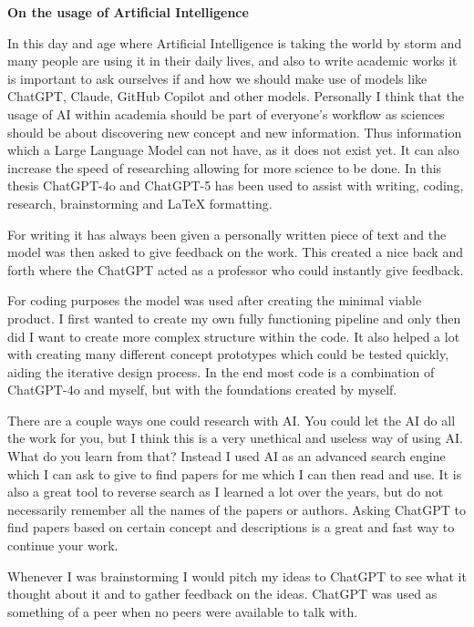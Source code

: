 \newpage
\vspace*{2.2 cm}
{\Large
\noindent
{\bf On the usage of Artificial Intelligence}} \\
\vspace*{0.3 cm}

\noindent
In this day and age where Artificial Intelligence is taking the world by storm and many people are using it in their daily lives, and also to write academic works it is important to ask ourselves if and how we should make use of models like ChatGPT, Claude, GitHub Copilot and other models. Personally I think that the usage of AI within academia should be part of everyone's workflow as sciences should be about discovering new concept and new information. Thus information which a Large Language Model can not have, as it does not exist yet. It can also increase the speed of researching allowing for more science to be done. In this thesis ChatGPT-4o and ChatGPT-5 has been used to assist with writing, coding, research, brainstorming and LaTeX formatting. 

For writing it has always been given a personally written piece of text and the model was then asked to give feedback on the work. This created a nice back and forth where the ChatGPT acted as a professor who could instantly give feedback.

For coding purposes the model was used after creating the minimal viable product. I first wanted to create my own fully functioning pipeline and only then did I want to create more complex structure within the code. It also helped a lot with creating many different concept prototypes which could be tested quickly, aiding the iterative design process. In the end most code is a combination of ChatGPT-4o and myself, but with the foundations created by myself.

There are a couple ways one could research with AI. You could let the AI do all the work for you, but I think this is a very unethical and useless way of using AI. What do you learn from that? Instead I used AI as an advanced search engine which I can ask to give to find papers for me which I can then read and use. It is also a great tool to reverse search as I learned a lot over the years, but do not necessarily remember all the names of the papers or authors. Asking ChatGPT to find papers based on certain concept and descriptions is a great and fast way to continue your work.

Whenever I was brainstorming I would pitch my ideas to ChatGPT to see what it thought about it and to gather feedback on the ideas. ChatGPT was used as something of a peer when no peers were available to talk with.

